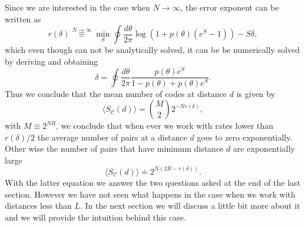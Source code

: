 Since we are interested in the case when $N\to \infty$, the error exponent can be written as
\begin{equation}
r(\delta)\stackrel{N\to \infty}{\equiv}\min_{S}\oint \frac{d\theta}{2\pi}\log\left(1+p(\theta)(e^S -1)\right) -S\delta,
\label{CH2:Error_exponent}
\end{equation}
which even though can not be analytically solved, it can be be numerically solved by deriving and obtaining
\begin{equation}
\delta = \oint \frac{d\theta}{2\pi} \frac{p(\theta)e^{S}}{1-p(\theta) + p(\theta)e^S}.
\end{equation}
Thus we conclude that the mean number of codes at distance $d$ is given by
\begin{equation}
\langle S_{\mathcal{C}}(d)\rangle = {M \choose 2} 2^{-Nr(\delta)},
\end{equation}
with $M\equiv 2^{NR}$, we conclude that when ever we work with rates lower than $r(\delta)/2$ the average number of pairs at a distance $d$ goes to zero exponentially. Other wise the number of pairs that have minimum distance $d$ are exponentially large
\begin{equation}
\langle S_{\mathcal{C}}(d)\rangle \doteq  2^{N(2R-r(\delta))}.
\end{equation}
With the latter equation we answer the two questions asked at the end of the last section. However we have not seen what happens in the case when we work with distances less than $L$. In the next section we will discuss a little bit more about it and we will provide the intuition behind this case.
